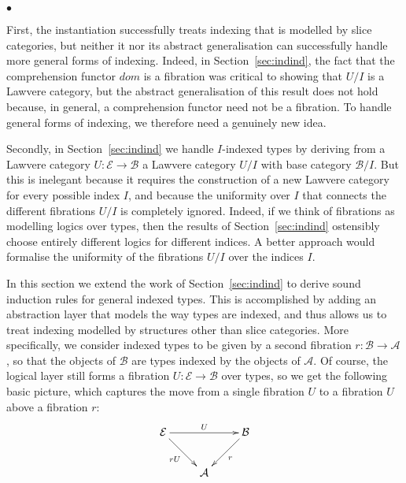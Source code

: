 \documentclass{LMCS}
\newcommand{\ra}{\rightarrow}
\newcommand\E{{\mathcal E}}
\newcommand\B{{\mathcal B}}
\newcommand\A{{\mathcal A}}
\theoremstyle{plain}
\theoremstyle{remark}
\theoremstyle{definition}
\begin{document}
\begin{iteMize}{$\bullet$}
\item First, the instantiation successfully treats indexing that is
  modelled by slice categories, but neither it nor its abstract
  generalisation can successfully handle more general forms of
  indexing. Indeed, in Section~\ref{sec:indind}, the fact that the
  comprehension functor $\mathit{dom}$ is a fibration was critical to
  showing that $U/I$ is a Lawvere category, but the abstract
  generalisation of this result does not hold because, in general, a
  comprehension functor need not be a fibration. To handle general
  forms of indexing, we therefore need a genuinely new idea.

\item Secondly, in Section~\ref{sec:indind} we handle $I$-indexed
  types by deriving from a Lawvere category $U:\E \ra \B$ a Lawvere
  category $U/I$ with base category $\B/I$. But this is inelegant
  because it requires the construction of a new Lawvere category for
  every possible index $I$, and because the uniformity over $I$ that
  connects the different fibrations $U/I$ is completely ignored.
  Indeed, if we think of fibrations as modelling logics over types,
  then the results of Section~\ref{sec:indind} ostensibly choose
  entirely different logics for different indices. A better approach
  would formalise the uniformity of the fibrations $U/I$ over the
  indices $I$.
\end{iteMize}

\vspace*{0.1in}

\noindent In this section we extend the work of Section~\ref{sec:indind} to
derive sound induction rules for general indexed types. This is
accomplished by adding an abstraction layer that models the way types
are indexed, and thus allows us to treat indexing modelled by
structures other than slice categories. More specifically, we consider
indexed types to be given by a second fibration $r:\B\to\A$, so that
the objects of $\B$ are types indexed by the objects of $\A$. Of
course, the logical layer still forms a fibration $U:\E\to\B$ over
types, so we get the following basic picture, which captures the move
from a single fibration $U$ to a fibration $U$ above a fibration $r$:
\[\xymatrix{ \E\ar[dr]_{rU} \ar[rr]^{U}
    & & \ar[ld]^r \B\\ & \A & }\] 

\vspace{0.1in}
\end{document}
